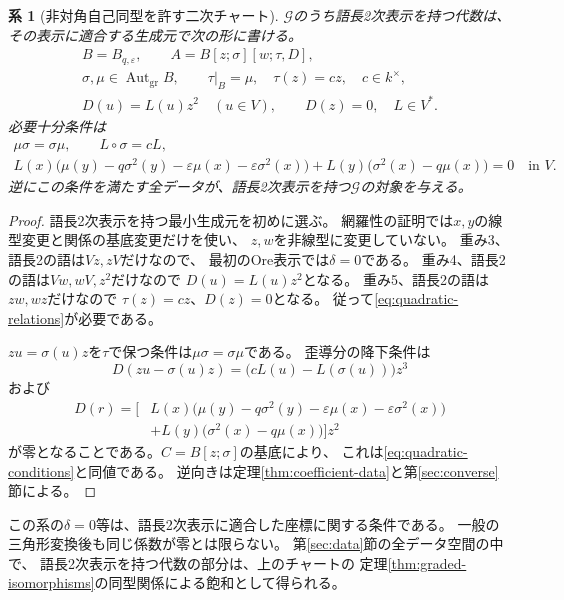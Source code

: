\documentclass[11pt,a4paper]{ltjsarticle}
\newtheorem{corollary}[theorem]{系}
\theoremstyle{definition}
\newcommand{\Aut}{\operatorname{Aut}}
\newcommand{\Gclass}{\mathcal G}
\begin{document}
\begin{corollary}[非対角自己同型を許す二次チャート]\label{cor:quadratic-chart}
$\Gclass$のうち語長2次表示を持つ代数は、
その表示に適合する生成元で次の形に書ける。
\begin{equation}\label{eq:quadratic-relations}
\begin{gathered}
B=B_{q,\varepsilon},\qquad
A=B[z;\sigma][w;\tau,D],\\
\sigma,\mu\in\Aut_{\mathrm{gr}}B,\qquad
\tau|_B=\mu,\quad \tau(z)=cz,\quad c\in k^\times,\\
D(u)=L(u)z^2\quad(u\in V),\qquad D(z)=0,\quad L\in V^*.
\end{gathered}
\end{equation}
必要十分条件は
\begin{equation}\label{eq:quadratic-conditions}
\begin{gathered}
\mu\sigma=\sigma\mu,\qquad L\circ\sigma=cL,\\
L(x)\bigl(\mu(y)-q\sigma^2(y)
-\varepsilon\mu(x)-\varepsilon\sigma^2(x)\bigr)
+L(y)\bigl(\sigma^2(x)-q\mu(x)\bigr)=0
\quad\text{in }V.
\end{gathered}
\end{equation}
逆にこの条件を満たす全データが、語長2次表示を持つ$\Gclass$の対象を与える。
\end{corollary}
\begin{proof}
語長2次表示を持つ最小生成元を初めに選ぶ。
網羅性の証明では$x,y$の線型変更と関係の基底変更だけを使い、
$z,w$を非線型に変更していない。
重み3、語長2の語は$Vz,zV$だけなので、
最初のOre表示では$\delta=0$である。
重み4、語長2の語は$Vw,wV,z^2$だけなので
$D(u)=L(u)z^2$となる。
重み5、語長2の語は$zw,wz$だけなので
$\tau(z)=cz$、$D(z)=0$となる。
従って\eqref{eq:quadratic-relations}が必要である。

$zu=\sigma(u)z$を$\tau$で保つ条件は$\mu\sigma=\sigma\mu$である。
歪導分の降下条件は
\[
D(zu-\sigma(u)z)=
\bigl(cL(u)-L(\sigma(u))\bigr)z^3
\]
および
\[
\begin{split}
D(r)=\bigl[
&L(x)\bigl(\mu(y)-q\sigma^2(y)
-\varepsilon\mu(x)-\varepsilon\sigma^2(x)\bigr)\\
&+L(y)\bigl(\sigma^2(x)-q\mu(x)\bigr)\bigr]z^2
\end{split}
\]
が零となることである。$C=B[z;\sigma]$の基底により、
これは\eqref{eq:quadratic-conditions}と同値である。
逆向きは定理\ref{thm:coefficient-data}と第\ref{sec:converse}節による。
\end{proof}

この系の$\delta=0$等は、語長2次表示に適合した座標に関する条件である。
一般の三角形変換後も同じ係数が零とは限らない。
第\ref{sec:data}節の全データ空間の中で、
語長2次表示を持つ代数の部分は、上のチャートの
定理\ref{thm:graded-isomorphisms}の同型関係による飽和として得られる。
\end{document}
